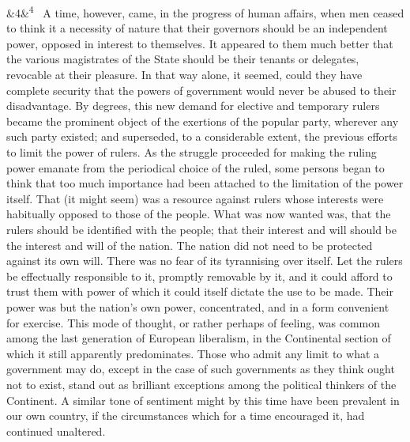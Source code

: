 \documentclass[12pt]{article}
\newcommand{\para}[1][]{\par\noindent\ifx&#1&\else\textsuperscript{\footnotesize #1}~\fi}
\begin{document}
\para[4] A time, however, came, in the progress of human affairs, when men ceased to think it a necessity of nature that their governors should be an independent power, opposed in interest to themselves. It appeared to them much better that the various magistrates of the State should be their tenants or delegates, revocable at their pleasure. In that way alone, it seemed, could they have complete security that the powers of government would never be abused to their disadvantage. By degrees, this new demand for elective and temporary rulers became the prominent object of the exertions of the popular party, wherever any such party existed; and superseded, to a considerable extent, the previous efforts to limit the power of rulers. As the struggle proceeded for making the ruling power emanate from the periodical choice of the ruled, some persons began to think that too much importance had been attached to the limitation of the power itself. That (it might seem) was a resource against rulers whose interests were habitually opposed to those of the people. What was now wanted was, that the rulers should be identified with the people; that their interest and will should be the interest and will of the nation. The nation did not need to be protected against its own will. There was no fear of its tyrannising over itself. Let the rulers be effectually responsible to it, promptly removable by it, and it could afford to trust them with power of which it could itself dictate the use to be made. Their power was but the nation's own power, concentrated, and in a form convenient for exercise. This mode of thought, or rather perhaps of feeling, was common among the last generation of European liberalism, in the Continental section of which it still apparently predominates. Those who admit any limit to what a government may do, except in the case of such governments as they think ought not to exist, stand out as brilliant exceptions among the political thinkers of the Continent. A similar tone of sentiment might by this time have been prevalent in our own country, if the circumstances which for a time encouraged it, had continued unaltered.
\end{document}
